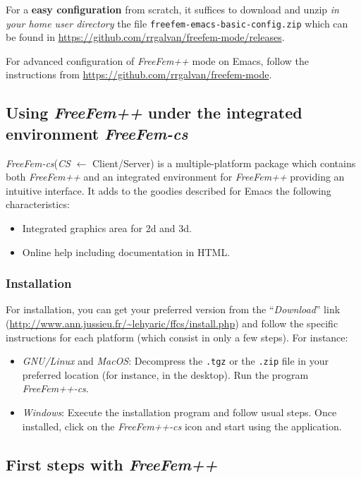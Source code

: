 \documentclass[12pt]{article}
\newcommand{\FF}{\textit{FreeFem++}\xspace}
\newcommand{\FFcs}{\textit{FreeFem-cs}\xspace}
\begin{document}
For a \textbf{easy configuration} from scratch, it suffices to
download and unzip \textit{in your home user directory} the file
\texttt{freefem-emacs-basic-config.zip} which can be found in
\url{https://github.com/rrgalvan/freefem-mode/releases}.

For advanced configuration of \FF mode on Emacs, follow the
instructions from \url{https://github.com/rrgalvan/freefem-mode}.

\subsection{Using \FF under the integrated environment \FFcs}
\label{sec:freefem-CS}

\FFcs (\textit{CS} $\leftarrow$ Client/Server) is a multiple-platform
package which contains both \FF and an integrated environment for \FF
providing an intuitive interface. It adds to the goodies described for
Emacs the following characteristics:
\begin{itemize}
\item Integrated graphics area for 2d and 3d.
\item Online help including documentation in HTML.
\end{itemize}


\subsubsection{Installation}
For installation, you can get your preferred version from
the ``\textit{Download}'' link
(\url{http://www.ann.jussieu.fr/~lehyaric/ffcs/install.php}) and
follow the specific instructions for each  platform (which consist in
only a few steps). For instance:

\begin{itemize}
\item \textit{GNU/Linux} and \textit{MacOS}: Decompress the
  \texttt{.tgz} or the \texttt{.zip} file in your preferred location
  (for instance, in the desktop). Run the program \textit{FreeFem++-cs}.
\item \textit{Windows}: Execute the installation program and follow
  usual steps. Once installed, click on the \textit{FreeFem++-cs} icon
  and start using the application.
\end{itemize}

\subsection{First steps with \FF}
\end{document}
